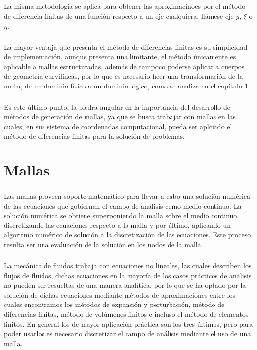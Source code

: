 \documentclass[letterpaper, openright, 12pt]{book}
\begin{document}
	\paragraph*{}
	La misma metodología se aplica para obtener las aproximacinoes por el método de diferencia finitas de una función respecto a un eje cualquiera, llámese eje $y$, $\xi$ o $\eta$.
	
	\paragraph*{}
	La mayor ventaja que presenta el método de diferencias finitas es su simplicidad de implementación, aunque presenta una limitante, el método únicamente es aplicable a mallas estructuradas, además de tampoco poderse aplicar a cuerpos de geometría curvilíneas, por lo que es necesario hcer una transformación de la malla, de un dominio físico a un dominio lógico, como se analiza en el capítulo \ref{chap:mallas}.
	
	\paragraph*{}
	Es este último punto, la piedra angular en la importancia del desarrollo de métodos de generación de mallas, ya que se busca trabajar con mallas en las cuales, en sus sistema de coordenadas computacional, pueda ser aplciado el método de diferencias finitas para la solución de problemas.
	
					
	\chapter{Mallas}
	\label{chap:mallas}
	\paragraph*{}
		Las mallas proveen soporte matemático para llevar a cabo una solución numérica de las ecuaciones que gobiernan el campo de análisis como medio continuo. La solución numérica se obtiene superponiendo la malla sobre el medio continuo, discretizando las ecuaciones respecto a la malla y por último, aplicando un algoritmo numérico de solución a la discretización de las ecuaciones. Este proceso resulta ser una evaluación de la solución en los nodos de la malla.
	\paragraph*{}
		La mecánica de fluidos trabaja con ecuaciones no lineales, las cuales describen los flujos de fluidos, dichas ecuaciones en la mayoría de los casos prácticos de análisis no pueden ser resueltas de una manera analítica, por lo que se ha optado por la solución de dichas ecuaciones mediante métodos de aproximaciones entre los cuales encontramos los métodos de expansión y perturbación, método de diferencias finitas, método de volúmenes finitos e incluso el método de elementos finitos. En general los de mayor aplicación práctica son los tres últimos, pero para poder usarlos es necesario discretizar el campo de análisis mediante el uso de una malla.\cite{thompsonhandbook}
\end{document}
